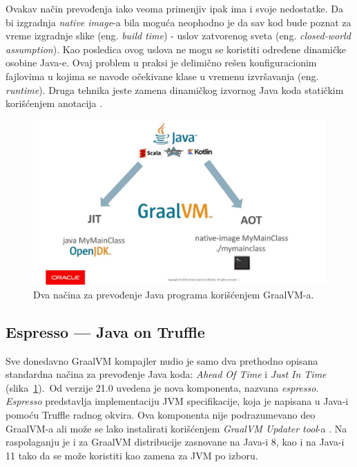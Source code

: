 \documentclass[a4paper]{article}
\begin{document}
Ovakav način prevođenja iako veoma primenjiv ipak ima i svoje nedostatke. Da bi izgradnja \emph{native image}-a bila moguća neophodno je da sav kod bude poznat za vreme izgradnje slike (eng. \emph{build time}) - uslov zatvorenog sveta (eng. \emph{closed-world assumption}). Kao posledica ovog uslova ne mogu se koristiti određene dinamičke osobine Java-e. Ovaj problem u praksi je delimično rešen konfiguracionim fajlovima u kojima se navode očekivane klase u vremenu izvršavanja (eng. \emph{runtime}). Druga tehnika jeste zamena dinamičkog izvornog Java koda statičkim korišćenjem anotacija \cite{graalvmnativeimage}.  


\begin{figure}
	\begin{center}
	\includegraphics[scale=0.25]{imgs/run_java.jpg}
	\end{center}
	\caption{Dva načina za prevođenje Java programa korišćenjem GraalVM-a.}
	\label{fig:runjava}
\end{figure}


\subsection{Espresso --- Java on Truffle}
\label{sub:espresso}

Sve donedavno GraalVM kompajler nudio je samo dva prethodno opisana standardna načina za prevođenje Java koda: \emph{Ahead Of Time} i \emph{Just In Time} (slika~\ref{fig:runjava}).\ Od verzije 21.0 uvedena je nova komponenta, nazvana \emph{espresso}. \emph{Espresso} predstavlja implementaciju JVM specifikacije, koja je napisana u Java-i pomoću Truffle radnog okvira. Ova komponenta nije podrazumevano deo GraalVM-a ali može se lako instalirati korišćenjem \emph{GraalVM Updater tool}-a \cite{graalvmjavaontruffle}. Na raspolaganju je i za GraalVM distribucije zasnovane na Java-i 8, kao i na Java-i 11 tako da se može koristiti kao zamena za JVM po izboru.
\end{document}
